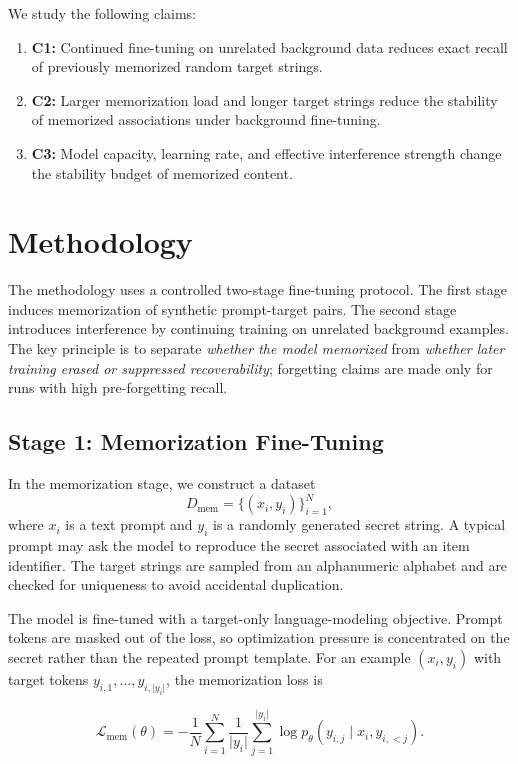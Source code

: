 \documentclass{article}
\begin{document}
We study the following claims:

\begin{enumerate}[leftmargin=*]
    \item \textbf{C1:} Continued fine-tuning on unrelated background data reduces exact recall of previously memorized random target strings.
    \item \textbf{C2:} Larger memorization load and longer target strings reduce the stability of memorized associations under background fine-tuning.
    \item \textbf{C3:} Model capacity, learning rate, and effective interference strength change the stability budget of memorized content.
\end{enumerate}

\section{Methodology}

The methodology uses a controlled two-stage fine-tuning protocol. The first stage induces memorization of synthetic prompt-target pairs. The second stage introduces interference by continuing training on unrelated background examples. The key principle is to separate \emph{whether the model memorized} from \emph{whether later training erased or suppressed recoverability}; forgetting claims are made only for runs with high pre-forgetting recall.

\subsection{Stage 1: Memorization Fine-Tuning}

In the memorization stage, we construct a dataset
\[
D_{\mathrm{mem}} = \{(x_i, y_i)\}_{i=1}^{N},
\]
where $x_i$ is a text prompt and $y_i$ is a randomly generated secret string. A typical prompt may ask the model to reproduce the secret associated with an item identifier. The target strings are sampled from an alphanumeric alphabet and are checked for uniqueness to avoid accidental duplication.

The model is fine-tuned with a target-only language-modeling objective. Prompt tokens are masked out of the loss, so optimization pressure is concentrated on the secret rather than the repeated prompt template. For an example $(x_i, y_i)$ with target tokens $y_{i,1}, \ldots, y_{i,\lvert y_i \rvert}$, the memorization loss is

\begin{equation}
\mathcal{L}_{\mathrm{mem}}(\theta)
=
-\frac{1}{N}
\sum_{i=1}^{N}
\frac{1}{\lvert y_i \rvert}
\sum_{j=1}^{\lvert y_i \rvert}
\log p_{\theta}(y_{i,j} \mid x_i, y_{i,<j}).
\end{equation}
\end{document}
